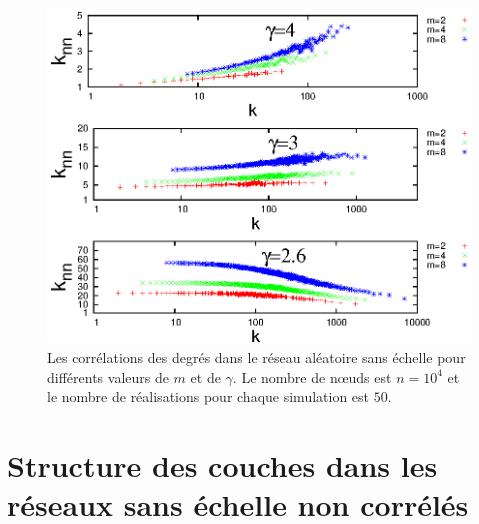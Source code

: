 \begin{figure}[h!]
	\centering
	\includegraphics[scale=1.2]{./figures/correlation}
	\caption{Les corrélations des degrés dans le réseau aléatoire sans échelle pour différents valeurs de $m$ et de $\gamma$. Le nombre de nœuds est $n=10^4$ et le nombre de réalisations pour chaque simulation est $50$.}
	\label{correlation}
\end{figure}
\vspace{3cm}
\section{Structure des couches dans les réseaux sans échelle non corrélés}
